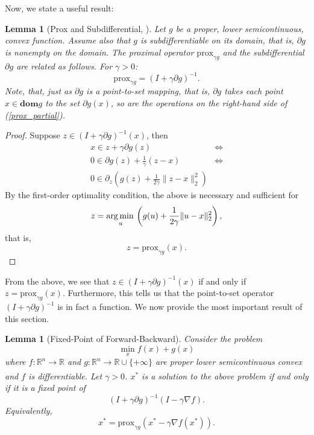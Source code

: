 \documentclass[11pt, twoside]{report}
\newtheorem{lemma}[theorem]{Lemma}
\begin{document}
Now, we state a useful result:
\begin{lemma}[Prox and Subdifferential, \cite{proxalgs}] \label{prox_subdif}
Let $g$ be a proper, lower semicontinuous, convex function. Assume also that $g$ is subdifferentiable on its domain, that is, $\partial g$ is nonempty on the domain. The proximal operator $\mathrm{prox}_{\gamma g}$ and the subdifferential $\partial g$ are related as follows. For $\gamma > 0$:
\begin{equation} \label{prox_partial}
    \mathrm{prox}_{\gamma g} = (I + \gamma \partial g)^{-1}.
\end{equation}
Note, that, just as $\partial g$ is a point-to-set mapping, that is, $\partial g$ takes each point $x \in \mathbf{dom}g$ to the set $\partial g (x)$, so are the operations on the right-hand side of (\ref{prox_partial}).
\end{lemma}
\begin{proof}
Suppose $z \in (I + \gamma \partial g)^{-1}(x)$, then
\begin{align*}
  x \in z + \gamma \partial g(z) &\iff \\
  0 \in \partial g(z) + \frac{1}{\gamma}(z-x) &\iff \\
  0 \in \partial_z \left(g(z) + \frac{1}{2\gamma} \|z-x\|_2^2 \right)
\end{align*}
By the first-order optimality condition, the above is necessary and sufficient for
\[z = \operatorname*{arg\, min \,}_u \left(g(u) + \frac{1}{2\gamma}\|u-x\|_2^2 \right),\]
that is,
\[z = \mathrm{prox}_{\gamma g}(x).\]
\end{proof}
From the above, we see that $z \in (I + \gamma \partial g)^{-1}(x)$ if and only if $z = \mathrm{prox}_{\gamma g}(x).$ Furthermore, this tells us that the point-to-set operator $(I + \gamma \partial g)^{-1}$ is in fact a function.
We now provide the most important result of this section.
\begin{lemma}[Fixed-Point of Forward-Backward]
Consider the problem
\[\min_x f(x) + g(x)\]
where $f: \mathbb{R}^n \xrightarrow[]{} \mathbb{R}$ and $g: \mathbb{R}^n \xrightarrow[]{} \mathbb{R} \cup \{+ \infty\}$ are proper lower semicontinuous convex and $f$ is differentiable. Let $\gamma > 0$. $x^*$ is a solution to the above problem if and only if it is a fixed point of
\[(I + \gamma \partial g)^{-1}(I - \gamma \nabla f).\]
Equivalently,
\[x^* = \mathrm{prox}_{\gamma g} \left(x^* - \gamma \nabla f(x^*)\right).\]
\end{lemma}
\end{document}

